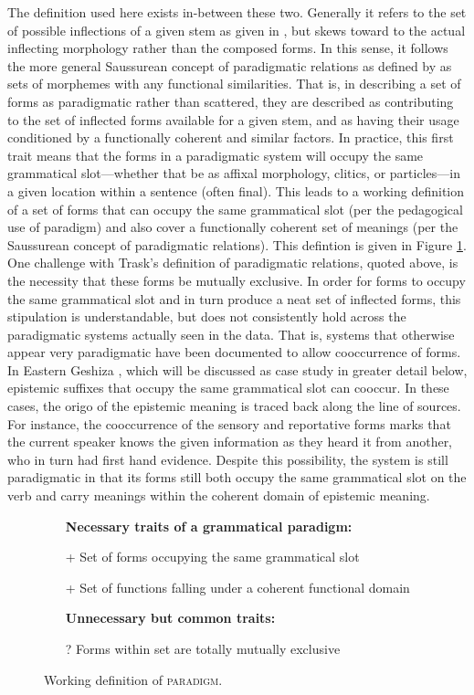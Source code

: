 The definition used here exists in-between these two. Generally it refers to the set of possible inflections of a given stem as given in , but skews toward to the actual inflecting morphology rather than the composed forms. In this sense, it follows the more general Saussurean concept of paradigmatic relations as defined by  as sets of morphemes with any functional similarities. That is, in describing a set of forms as paradigmatic rather than scattered, they are described as contributing to the set of inflected forms available for a given stem, and as having their usage conditioned by a functionally coherent and similar factors. In practice, this first trait means that the forms in a paradigmatic system will occupy the same grammatical slot---whether that be as affixal morphology, clitics, or particles---in a given location within a sentence (often final). This leads to a working definition of a set of forms that can occupy the same grammatical slot (per the pedagogical use of paradigm) and also cover a functionally coherent set of meanings (per the Saussurean concept of paradigmatic relations). This defintion is given in Figure \ref{f:Discussion:Paradigm}. One challenge with Trask's definition of paradigmatic relations, quoted above, is the necessity that these forms be mutually exclusive. In order for forms to occupy the same grammatical slot and in turn produce a neat set of inflected forms, this stipulation is understandable, but does not consistently hold across the paradigmatic systems actually seen in the data. That is, systems that otherwise appear very paradigmatic have been documented to allow cooccurrence of forms. In Eastern Geshiza \cite[rGyalrongic: PRC,][]{Honkasalo2019}, which will be discussed as case study in greater detail below, epistemic suffixes that occupy the same grammatical slot can cooccur. In these cases, the origo of the epistemic meaning is traced back along the line of sources. For instance, the cooccurrence of the sensory and reportative forms marks that the current speaker knows the given information as they heard it from another, who in turn had first hand evidence. Despite this possibility, the system is still paradigmatic in that its forms still both occupy the same grammatical slot on the verb and carry meanings within the coherent domain of epistemic meaning.

\begin{figure}
    \begin{itemize}
        \item[] \textbf{Necessary traits of a grammatical paradigm:}
        \item[+] Set of forms occupying the same grammatical slot
        \item[+] Set of functions falling under a coherent functional domain
        \item[] \textbf{Unnecessary but common traits:}
        \item[?] Forms within set are totally mutually exclusive
    \end{itemize}
    \caption{Working definition of \textsc{paradigm}.}\label{f:Discussion:Paradigm}
\end{figure}

